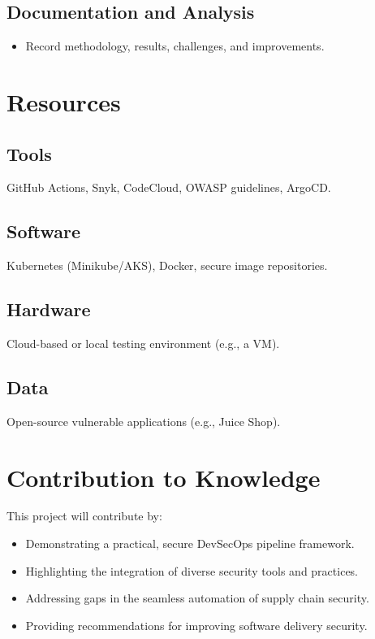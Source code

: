 \documentclass[a4paper,12pt]{article}
\begin{document}
\subsection*{Documentation and Analysis}
\begin{itemize}
    \item Record methodology, results, challenges, and improvements.
\end{itemize}

\section{Resources}
\subsection*{Tools}
GitHub Actions, Snyk, CodeCloud, OWASP guidelines, ArgoCD.

\subsection*{Software}
Kubernetes (Minikube/AKS), Docker, secure image repositories.

\subsection*{Hardware}
Cloud-based or local testing environment (e.g., a VM).

\subsection*{Data}
Open-source vulnerable applications (e.g., Juice Shop).

\section{Contribution to Knowledge}
This project will contribute by:
\begin{itemize}
    \item Demonstrating a practical, secure DevSecOps pipeline framework.
    \item Highlighting the integration of diverse security tools and practices.
    \item Addressing gaps in the seamless automation of supply chain security.
    \item Providing recommendations for improving software delivery security.
\end{itemize}
\end{document}
